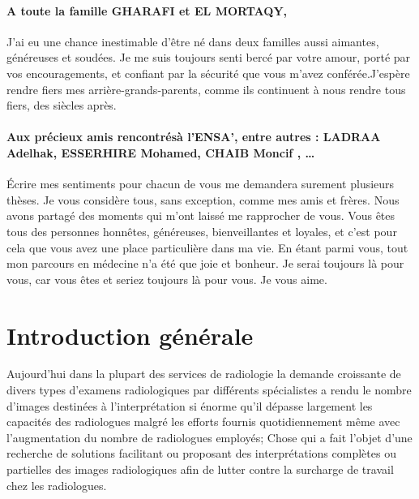 \documentclass[12pt]{report}
\begin{document}
        \subsubsection*{A toute la famille GHARAFI et EL MORTAQY, }
        J’ai eu une chance inestimable d’être né dans deux familles aussi aimantes, généreuses et soudées. Je me suis toujours senti bercé par votre amour, porté par vos encouragements, et confiant par la sécurité que vous m’avez conférée.J’espère rendre fiers mes arrière-grands-parents, comme ils continuent à nous rendre tous fiers, des siècles après. 
        \subsubsection*{Aux précieux amis rencontrésà l'ENSA', entre autres : LADRAA Adelhak, ESSERHIRE Mohamed, CHAIB Moncif , … }
        Écrire mes sentiments pour chacun de vous me demandera surement plusieurs thèses. Je vous considère tous, sans exception, comme mes amis et frères. Nous avons partagé des moments qui m’ont laissé me rapprocher de vous. Vous êtes tous des personnes honnêtes, généreuses, bienveillantes et loyales, et c’est pour cela que vous avez une place particulière dans ma vie. En étant parmi vous, tout mon parcours en médecine n’a été que joie et bonheur. Je serai toujours là pour vous, car vous êtes et seriez toujours là pour vous. Je vous aime. 
        
    \justifying
       
        
    
    \clearpage
    \tableofcontents
    \clearpage
    \listoffigures
    \clearpage
    \listoftables
    \clearpage
    
   \listofmyequations


   \chapter*{Introduction générale}
   Aujourd'hui dans la plupart des services de radiologie la demande croissante de divers types d'examens radiologiques par différents spécialistes a rendu le nombre d'images destinées à l'interprétation si énorme qu'il dépasse largement les capacités des radiologues malgré les efforts fournis quotidiennement   même avec l'augmentation du nombre de radiologues employés; Chose qui a fait l’objet d’une recherche de solutions facilitant ou proposant des interprétations complètes ou partielles des images radiologiques afin de lutter contre la surcharge de travail chez les radiologues.
 
\end{document}
